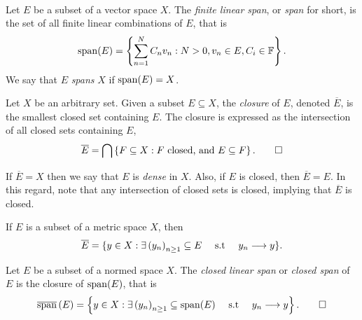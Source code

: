 \documentclass[../thesis.tex]{subfiles}
\begin{document}
\\
\begin{definition}[Span]\label{def:span}  %
    Let $E$ be a subset of a vector space $X$. The \emph{finite linear span}, or \emph{span} for short, is the set of all finite linear combinations of $E$, that is
    \begin{equation*}
        \operatorname{span}(E)=\left\{\sum_{n=1}^N C_n v_n : N>0, v_n \in E, C_i \in \mathbb{F}\right\}.
    \end{equation*}
    We say that $E$ \emph{spans} $X$ if $\operatorname{span}(E) = X$.
\end{definition}

\begin{definition}[Closure]\label{def:closure}  %
    Let $X$ be an arbitrary set. Given a subset $E \subseteq X$, the \emph{closure} of $E$, denoted $\overline{E}$, is the smallest closed set containing $E$. The closure is expressed as the intersection of all closed sets containing $E$,
    \begin{equation*}
        \overline{E} = \bigcap \left\{F \subseteq X : F \text{ closed, and } E \subseteq F\right\}. \qedhere
    \end{equation*}
\end{definition}
If $\overline{E} = X$ then we say that $E$ is \emph{dense} in $X$. Also, if $E$ is closed, then $\overline{E}=E$. In this regard, note that any intersection of closed sets is closed, implying that $\overline{E}$ is closed.
\begin{remark} %
    If $E$ is a subset of a metric space $X$, then
    \begin{equation*} %
        \overline{E} = \{ y \in X : \exists \space \bracMed{y_n}_{n\geq 1} \subseteq E \quad \text{ s.t }\quad y_n \longrightarrow y\}.
    \end{equation*}
\end{remark}

\begin{definition}\label{def:closed_span}  %
    Let $E$ be a subset of a normed space $X$. The \emph{closed linear span} or \emph{closed span} of $E$ is the closure of $\operatorname{span}(E)$, that is
    \begin{equation*}
        \overline{\operatorname{span}}\left(E\right) = \left\{y\in X: \exists \space \left(y_n\right)_{n\geq 1} \subseteq \operatorname{span}(E) \quad \text{ s.t } \quad y_n \longrightarrow y\right\}. \qedhere
    \end{equation*}
\end{definition}
\end{document}
